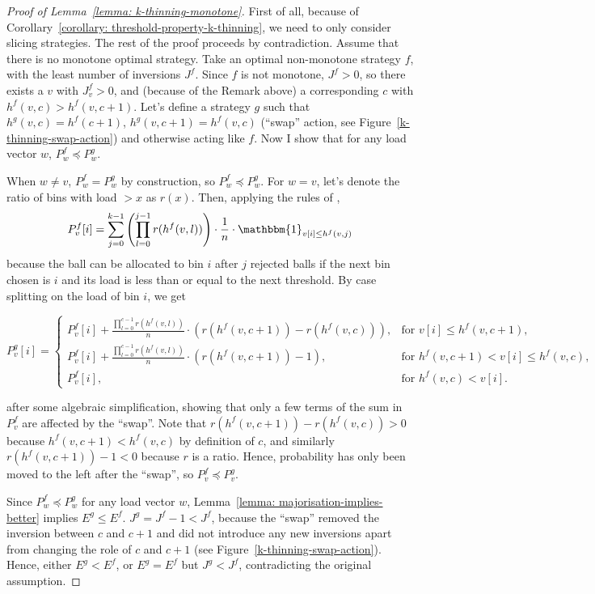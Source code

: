 \begin{proof}[Proof of Lemma~\ref{lemma: k-thinning-monotone}]
    First of all, because of Corollary~\ref{corollary: threshold-property-k-thinning}, we need to only consider slicing strategies.
    The rest of the proof proceeds by contradiction. Assume that there is no monotone optimal strategy. Take an optimal non-monotone strategy $f$, with the least number of inversions $J^f$. Since $f$ is not monotone, $J^f>0$, so there exists a $v$ with $J^f_v>0$, and (because of the Remark above) a corresponding $c$ with $h^f(v,c)>h^f(v,c+1)$. Let's define a strategy $g$ such that $h^g(v,c)=h^f(c+1)$, $h^g(v,c+1)=h^f(v,c)$ (``swap'' action, see Figure~\ref{k-thinning-swap-action}) and otherwise acting like $f$. Now I show that for any load vector $w$, $P^f_w \preccurlyeq P^g_w$.
    
    When $w\neq v$, $P^f_w=P^g_w$ by construction, so $P^f_w \preccurlyeq P^g_w$. For $w=v$, let's denote the ratio of bins with load $>x$ as $r(x)$. Then, applying the rules of \KThinning, $$P^f_v[i]=\sum_{j=0}^{k-1} \left(\prod_{l=0}^{j-1} r(h^f(v,l))\right)\cdot\frac{1}{n}\cdot\mathbbm{1}_{v[i]\leq h^f(v,j)}$$ because the ball can be allocated to bin $i$ after $j$ rejected balls if the next bin chosen is $i$ and its load is less than or equal to the next threshold. By case splitting on the load of bin $i$, we get
    
    $$P^g_v[i]= \begin{cases}
        P^f_v[i]+\frac{\prod_{l=0}^{c-1} r(h^f(v,l))}{n}\cdot(r(h^f(v,c+1))-r(h^f(v,c))), & \text{for } v[i]\leq h^f(v,c+1),\\
        P^f_v[i]+\frac{\prod_{l=0}^{c-1} r(h^f(v,l))}{n}\cdot(r(h^f(v,c+1))-1), & \text{for } h^f(v,c+1)<v[i]\leq h^f(v,c),\\
        P^f_v[i], & \text{for } h^f(v,c)<v[i].
    \end{cases}$$
    
    after some algebraic simplification, showing that only a few terms of the sum in $P_v^f$ are affected by the ``swap''. Note that $r(h^f(v,c+1))-r(h^f(v,c))>0$ because $h^f(v,c+1)<h^f(v,c)$ by definition of $c$, and similarly $r(h^f(v,c+1))-1<0$ because $r$ is a ratio. Hence, probability has only been moved to the left after the ``swap'', so $P^f_v \preccurlyeq P^g_v$.
    
    Since $P^f_w\preccurlyeq P^g_w$ for any load vector $w$, Lemma~\ref{lemma: majorisation-implies-better} implies $E^g\leq E^f$. $J^g=J^f-1<J^f$, because the ``swap'' removed the inversion between $c$ and $c+1$ and did not introduce any new inversions apart from changing the role of $c$ and $c+1$ (see Figure~\ref{k-thinning-swap-action}). Hence, either $E^g<E^f$, or $E^g=E^f$ but $J^g<J^f$, contradicting the original assumption.
\end{proof}

